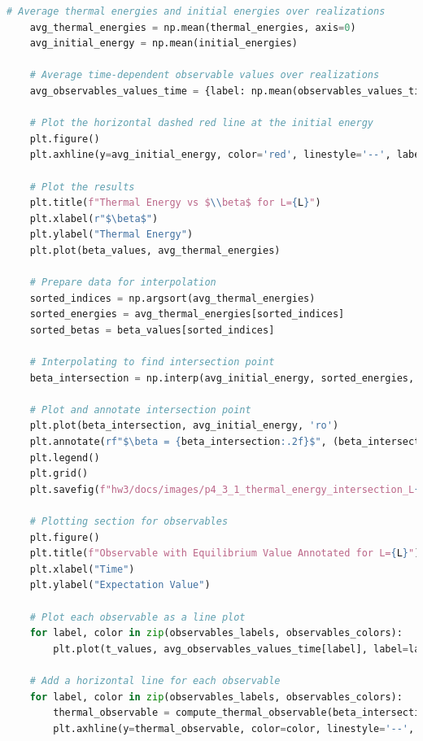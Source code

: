 \documentclass[12pt]{article}
\begin{document}
\begin{lstlisting}[language=Python]
    # Average thermal energies and initial energies over realizations
    avg_thermal_energies = np.mean(thermal_energies, axis=0)
    avg_initial_energy = np.mean(initial_energies)
    
    # Average time-dependent observable values over realizations
    avg_observables_values_time = {label: np.mean(observables_values_time[label], axis=0) for label in observables_labels}
    
    # Plot the horizontal dashed red line at the initial energy
    plt.figure()
    plt.axhline(y=avg_initial_energy, color='red', linestyle='--', label=rf"Initial Energy at {avg_initial_energy:.2f}")

    # Plot the results
    plt.title(f"Thermal Energy vs $\\beta$ for L={L}")
    plt.xlabel(r"$\beta$")
    plt.ylabel("Thermal Energy")
    plt.plot(beta_values, avg_thermal_energies)
    
    # Prepare data for interpolation
    sorted_indices = np.argsort(avg_thermal_energies)
    sorted_energies = avg_thermal_energies[sorted_indices]
    sorted_betas = beta_values[sorted_indices]

    # Interpolating to find intersection point
    beta_intersection = np.interp(avg_initial_energy, sorted_energies, sorted_betas)
    
    # Plot and annotate intersection point
    plt.plot(beta_intersection, avg_initial_energy, 'ro')
    plt.annotate(rf"$\beta = {beta_intersection:.2f}$", (beta_intersection, avg_initial_energy), textcoords="offset points", xytext=(0, 10), ha='center', color='red')
    plt.legend()
    plt.grid()
    plt.savefig(f"hw3/docs/images/p4_3_1_thermal_energy_intersection_L{L}.png")

    # Plotting section for observables
    plt.figure()
    plt.title(f"Observable with Equilibrium Value Annotated for L={L}")
    plt.xlabel("Time")
    plt.ylabel("Expectation Value")

    # Plot each observable as a line plot
    for label, color in zip(observables_labels, observables_colors):
        plt.plot(t_values, avg_observables_values_time[label], label=label, color=color)

    # Add a horizontal line for each observable
    for label, color in zip(observables_labels, observables_colors):
        thermal_observable = compute_thermal_observable(beta_intersection, eigenvalues, eigenvectors, full_observables[observables_labels.index(label)])
        plt.axhline(y=thermal_observable, color=color, linestyle='--', label=rf"{label} at $\beta_{{eq}} = {beta_intersection:.2f}$")


\end{lstlisting}
\end{document}
